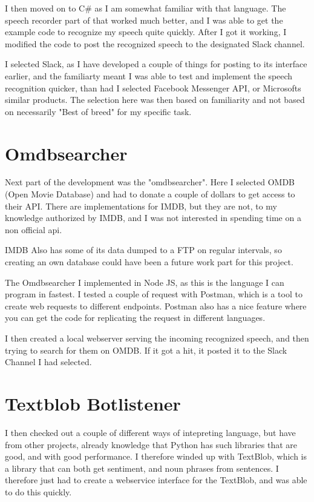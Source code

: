 \documentclass[11pt,fleqn]{book} %
\begin{document}
I then moved on to C\# as I am somewhat familiar with that language. The speech recorder part of that worked much better, and I was able to get the example code to recognize my speech quite quickly.
After I got it working, I modified the code to post the recognized speech to the designated Slack channel.

I selected Slack, as I have developed a couple of things for posting to its interface earlier, and the familiarty meant I was able to test and implement the speech recognition quicker, than had I selected Facebook Messenger API, or Microsofts similar products.
The selection here was then based on familiarity and not based on necessarily "Best of breed" for my specific task.



\section{Omdbsearcher}
Next part of the development was the "omdbsearcher". Here I selected OMDB (Open Movie Database) and had to donate a couple of dollars to get access to their API. There are implementations for IMDB, but they are not, to my knowledge authorized by IMDB, and I was not interested in spending time on a non official api.

IMDB Also has some of its data dumped to a FTP on regular intervals, so creating an own database could have been a future work part for this project. \cite{IMDbAlternativeInterfaces}

The Omdbsearcher I implemented in Node JS, as this is the language I can program in fastest. I tested a couple of request with Postman, which is a tool to create web requests to different endpoints. Postman also has a nice feature where you can get the code for replicating the request in different languages.

I then created a local webserver serving the incoming recognized speech, and then trying to search for them on OMDB. If it got a hit, it posted it to the Slack Channel I had selected.

\section{Textblob Botlistener}
I then checked out a couple of different ways of intepreting language, but have from other projects, already knowledge that Python has such libraries that are good, and with good performance. I therefore winded up with TextBlob, which is a library that can both get sentiment, and noun phrases\cite{WikipediaNounPhrase} from sentences. \cite{TextBlobTutorial:Documentation} 
I therefore just had to create a webservice interface for the TextBlob, and was able to do this quickly.
\end{document}
